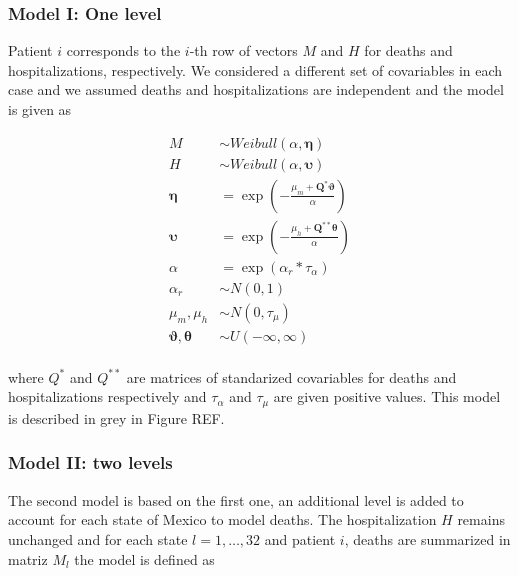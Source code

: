 \documentclass[10pt,letterpaper]{article}
\begin{document}
\hypertarget{model-i-one-level}{%
\subsubsection{Model I: One level}\label{model-i-one-level}}

Patient \(i\) corresponds to the \(i\)-th row of vectors \(M\) and \(H\)
for deaths and hospitalizations, respectively. We considered a different
set of covariables in each case and we assumed deaths and
hospitalizations are independent and the model is given as

\[
\begin{aligned}
 {M}  &\sim Weibull(\alpha,\mathbf{\eta})\\
 {H}  &\sim Weibull(\alpha,\mathbf{\upsilon}) \\
 \mathbf{\eta} &= \exp\left(-\frac{\mu_m+\mathbf{Q}^*\mathbf{\vartheta}}{\alpha}\right) \\
 \mathbf{\upsilon} &= \exp\left(-\frac{\mu_h+\mathbf{Q}^{**}\mathbf{\theta}}{\alpha}\right) \\
 \alpha&=\exp(\alpha_r*\tau_\alpha) \\
 \alpha_r&\sim N(0,1) \\
 \mu_m,\mu_h &\sim N(0,\tau_\mu) \\
 \mathbf{\vartheta},\mathbf{\theta} &\sim U(-\infty,\infty) \\
\end{aligned}
\]

where \(Q^*\) and \(Q^{**}\) are matrices of standarized covariables for
deaths and hospitalizations respectively and \(\tau_\alpha\) and
\(\tau_{\mu}\) are given positive values. This model is described in
grey in Figure REF.

\hypertarget{model-ii-two-levels}{%
\subsubsection{Model II: two levels}\label{model-ii-two-levels}}

The second model is based on the first one, an additional level is added
to account for each state of Mexico to model deaths. The hospitalization
\(H\) remains unchanged and for each state \(l= 1,\ldots, 32\) and
patient \(i\), deaths are summarized in matriz \(M_{l}\) the model is
defined as
\end{document}
